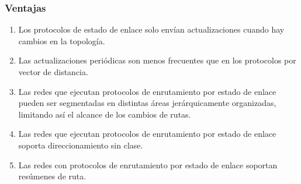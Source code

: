 \documentclass[
	12pt, %
	fleqn, %
	a4paper, %
	oneside, %
]{LegrandOrangeBook}
\begin{document}
\subsubsection*{Ventajas}
\begin{enumerate}
\item Los protocolos de estado de enlace solo envían actualizaciones cuando
hay cambios en la topología.
\item Las actualizaciones periódicas son menos frecuentes que en los protocolos por vector de distancia.
\item Las redes que ejecutan protocolos de enrutamiento por estado de enlace pueden ser segmentadas en distintas áreas jerárquicamente organizadas, limitando así el alcance de los cambios de rutas.
\item Las redes que ejecutan protocolos de enrutamiento por estado de enlace soporta direccionamiento sin clase.
\item Las redes con protocolos de enrutamiento por estado de enlace soportan resúmenes de ruta.
\end{enumerate}
\end{document}
